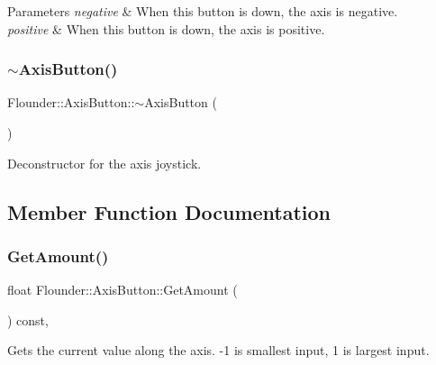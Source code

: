 \begin{DoxyParams}{Parameters}
{\em negative} & When this button is down, the axis is negative. \\
\hline
{\em positive} & When this button is down, the axis is positive. \\
\hline
\end{DoxyParams}
\mbox{\label{class_flounder_1_1_axis_button_a6e1fe136c199ced1f92ba1187faae91e}} 
\subsubsection{\texorpdfstring{$\sim$\+Axis\+Button()}{~AxisButton()}}
{\footnotesize\ttfamily Flounder\+::\+Axis\+Button\+::$\sim$\+Axis\+Button (\begin{DoxyParamCaption}{ }\end{DoxyParamCaption})}



Deconstructor for the axis joystick. 



\subsection{Member Function Documentation}
\mbox{\label{class_flounder_1_1_axis_button_af7ee21d3b33a7d0eadf6656fec5bdc29}} 
\subsubsection{\texorpdfstring{Get\+Amount()}{GetAmount()}}
{\footnotesize\ttfamily float Flounder\+::\+Axis\+Button\+::\+Get\+Amount (\begin{DoxyParamCaption}{ }\end{DoxyParamCaption}) const\hspace{0.3cm}{\ttfamily [override]}, {\ttfamily [virtual]}}



Gets the current value along the axis. -\/1 is smallest input, 1 is largest input. 

